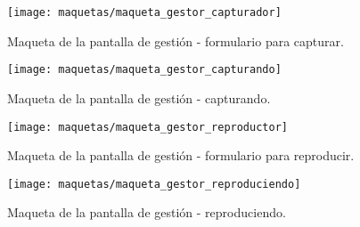 \begin{figure}[!htp]
  \centering
  \texttt{[image: maquetas/maqueta\_gestor\_capturador]}
  \caption{Maqueta de la pantalla de gestión - formulario para capturar.}
  \label{fig:maqueta:gestor_capturador}
\end{figure}

\begin{figure}[!htp]
  \centering
  \texttt{[image: maquetas/maqueta\_gestor\_capturando]}
  \caption{Maqueta de la pantalla de gestión - capturando.}
  \label{fig:maqueta:gestor_capturando}
\end{figure}

\begin{figure}[!htp]
  \centering
  \texttt{[image: maquetas/maqueta\_gestor\_reproductor]}
  \caption{Maqueta de la pantalla de gestión - formulario para reproducir.}
  \label{fig:maqueta:gestor_reproductor}
\end{figure}

\begin{figure}[!htp]
  \centering
  \texttt{[image: maquetas/maqueta\_gestor\_reproduciendo]}
  \caption{Maqueta de la pantalla de gestión - reproduciendo.}
  \label{fig:maqueta:gestor_reproduciendo}
\end{figure}